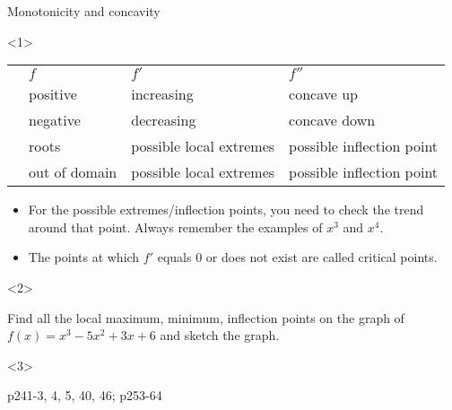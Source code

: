 \begin{frame}{Monotonicity and concavity}

\begin{onlyenv}<1>


\begin{center}
\begin{tabular}{|>{\raggedleft}p{}|>{\raggedright}p{}|>{\raggedright}p{}|>{\raggedright}p{}|}
\hline 
 & {\small{}$f$} & {\small{}$f'$} & {\small{}$f''$}\tabularnewline
{\small{}$>0$} & {\small{}positive} & {\small{}increasing} & {\small{}concave up}\tabularnewline
{\small{}$<0$} & {\small{}negative} & {\small{}decreasing} & {\small{}concave down}\tabularnewline
{\small{}$=0$} & {\small{}roots} & {\small{}possible local extremes} & {\small{}possible inflection point}\tabularnewline
{\small{}not exist} & {\small{}out of domain} & {\small{}possible local extremes} & {\small{}possible inflection point}\tabularnewline
\hline 
\end{tabular}
\par\end{center}
\begin{itemize}
\item For the possible extremes/inflection points, you need to check the
trend around that point. Always remember the examples of $x^{3}$
and $x^{4}$.
\item The points at which $f'$ equals $0$ or does not exist are called
\alert{critical points}.
\end{itemize}
\end{onlyenv}



\begin{onlyenv}<2>

\begin{example}
Find all the local maximum, minimum, inflection points on the graph
of $f\left(x\right)=x^{3}-5x^{2}+3x+6$ and sketch the graph.
\end{example}

\end{onlyenv}



\begin{onlyenv}<3>

\begin{example}
p241-3, 4, 5, 40, 46; p253-64
\end{example}

\end{onlyenv}

\end{frame}

